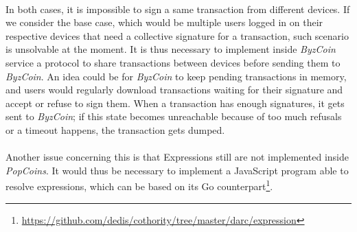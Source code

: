\paragraph{}

In both cases, it is impossible to sign a same transaction from different devices. If we consider the base case, which would be multiple users logged in on their respective devices that need a collective signature for a transaction, such scenario is unsolvable at the moment. It is thus necessary to implement inside \textit{ByzCoin} service a protocol to share transactions between devices before sending them to \textit{ByzCoin}. An idea could be for \textit{ByzCoin} to keep pending transactions in memory, and users would regularly download transactions waiting for their signature and accept or refuse to sign them. When a transaction has enough signatures, it gets sent to \textit{ByzCoin}; if this state becomes unreachable because of too much refusals or a timeout happens, the transaction gets dumped.

\paragraph{}

Another issue concerning this is that Expressions still are not implemented inside \textit{PopCoins}. It would thus be necessary to implement a JavaScript program able to resolve expressions, which can be based on its Go counterpart\footnote{\url{https://github.com/dedis/cothority/tree/master/darc/expression}}.